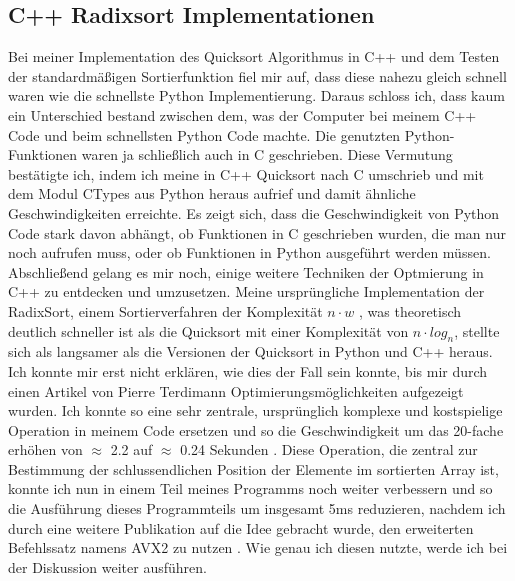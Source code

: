 \documentclass[10pt,a4paper]{article}
\begin{document}
\subsection{C++ Radixsort Implementationen}

\begin{bchart}[min=0, max=2.5, scale=2.1]
    \smallskip
    \smallskip
    \smallskip
    \smallskip
\end{bchart}

Bei meiner Implementation des Quicksort Algorithmus in C++ und dem Testen der standardmäßigen Sortierfunktion
fiel mir auf, dass diese nahezu gleich schnell waren wie die schnellste Python Implementierung.
Daraus schloss ich, dass kaum ein Unterschied bestand zwischen dem, was der Computer bei meinem C++ Code und beim schnellsten Python Code machte.
Die genutzten Python-Funktionen waren ja schließlich auch in C geschrieben. Diese Vermutung bestätigte ich, indem
ich meine in C++ Quicksort nach C umschrieb und mit dem Modul CTypes aus Python heraus aufrief und damit ähnliche Geschwindigkeiten
erreichte. Es zeigt sich, dass die Geschwindigkeit von Python Code stark davon abhängt, ob Funktionen in C geschrieben wurden,
die man nur noch aufrufen muss, oder ob Funktionen in Python ausgeführt werden müssen.
Abschließend gelang es mir noch, einige weitere Techniken der Optmierung in C++ zu entdecken und umzusetzen.
Meine ursprüngliche Implementation der RadixSort, einem Sortierverfahren der Komplexität $n \cdot w$ , was theoretisch deutlich schneller ist als die Quicksort
mit einer Komplexität von $n \cdot log_{n}$, stellte sich als langsamer als die Versionen  der Quicksort in Python und C++ heraus.
Ich konnte mir erst nicht erklären, wie dies der Fall sein konnte, bis mir durch einen Artikel von Pierre Terdimann Optimierungsmöglichkeiten
aufgezeigt wurden. Ich konnte so eine sehr zentrale, ursprünglich komplexe und kostspielige Operation in meinem Code ersetzen
und so die Geschwindigkeit um das 20-fache erhöhen von $\approx$ 2.2 auf $\approx$ 0.24 Sekunden \cite{terdiman}.
Diese Operation, die zentral zur Bestimmung der schlussendlichen Position der Elemente im sortierten Array ist, konnte ich nun in einem Teil meines Programms noch weiter verbessern und so die Ausführung dieses Programmteils
um insgesamt 5ms reduzieren, nachdem ich durch eine weitere Publikation auf die Idee gebracht wurde, den erweiterten Befehlssatz namens
AVX2 zu nutzen \cite{michael}. Wie genau ich diesen nutzte, werde ich bei der Diskussion weiter ausführen.
\end{document}
